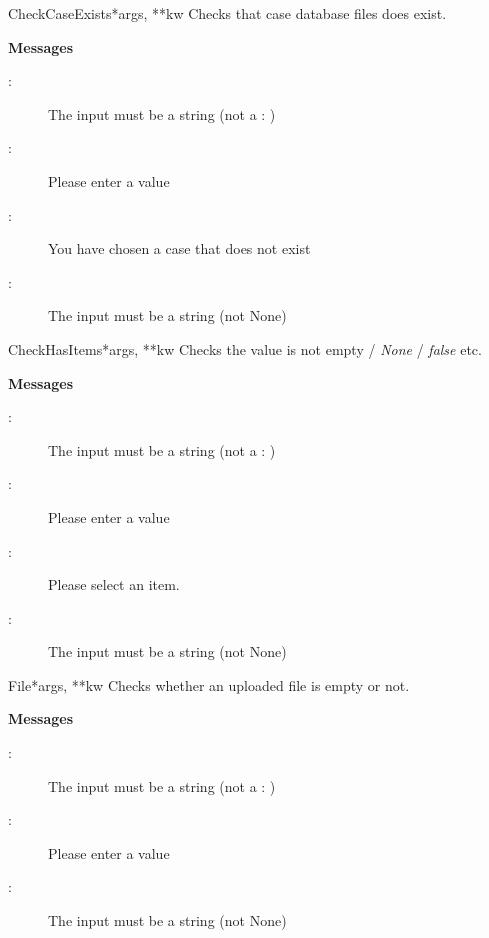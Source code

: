 \documentclass[letterpaper,10pt,english]{manual}
\begin{document}
\hypertarget{webscavator.forms.validators.CheckCaseExists}{}\begin{classdesc}{CheckCaseExists}{*args, **kw}
Checks that case database files does exist.

\textbf{Messages}
\begin{description}
\item[:]
The input must be a string (not a : )

\item[:]
Please enter a value

\item[:]
You have chosen a case that does not exist

\item[:]
The input must be a string (not None)

\end{description}
\end{classdesc}

\hypertarget{webscavator.forms.validators.CheckHasItems}{}\begin{classdesc}{CheckHasItems}{*args, **kw}
Checks the value is not empty / \emph{None} / \emph{false} etc.

\textbf{Messages}
\begin{description}
\item[:]
The input must be a string (not a : )

\item[:]
Please enter a value

\item[:]
Please select an item.

\item[:]
The input must be a string (not None)

\end{description}
\end{classdesc}

\hypertarget{webscavator.forms.validators.File}{}\begin{classdesc}{File}{*args, **kw}
Checks whether an uploaded file is empty or not.

\textbf{Messages}
\begin{description}
\item[:]
The input must be a string (not a : )

\item[:]
Please enter a value

\item[:]
The input must be a string (not None)

\end{description}
\end{classdesc}
\end{document}

